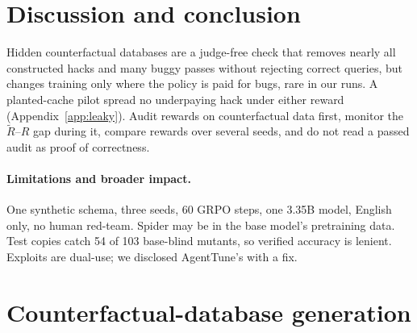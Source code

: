 \documentclass{article}
\begin{document}
\section{Discussion and conclusion}
\label{sec:discussion}

Hidden counterfactual databases are a judge-free check that removes nearly all constructed hacks and many buggy passes without rejecting correct queries, but changes training only where the policy is paid for bugs, rare in our runs. A planted-cache pilot spread no underpaying hack under either reward (Appendix~\ref{app:leaky}). Audit rewards on counterfactual data first, monitor the $\tilde R$--$R$ gap during it, compare rewards over several seeds, and do not read a passed audit as proof of correctness.

\paragraph{Limitations and broader impact.}
One synthetic schema, three seeds, 60 GRPO steps, one 3.35B model, English only, no human red-team. Spider may be in the base model's pretraining data. Test copies catch 54 of 103 base-blind mutants, so verified accuracy is lenient. Exploits are dual-use; we disclosed AgentTune's with a fix.


{\small
}

\clearpage
\appendix

\section{Counterfactual-database generation}
\label{app:cf}
\end{document}
